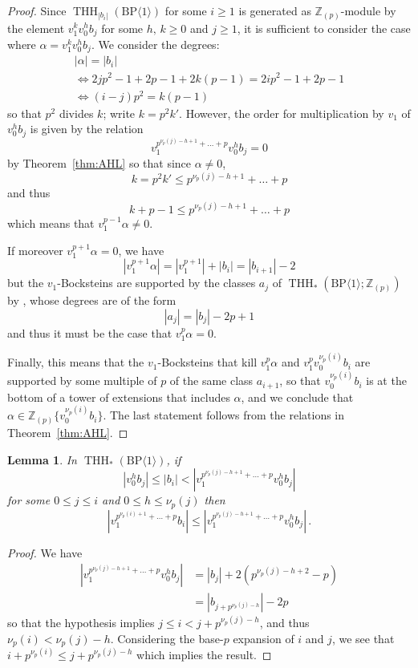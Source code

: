 \documentclass[11pt]{amsart}
\newcommand{\mr}[1]{\mathrm{#1}}
\newcommand{\Z}{\mathbb{Z}}
\newcommand{\BP}{\mr{BP}}
\DeclareMathOperator{\THH}{THH}
\newtheorem{lemma}[equation]{Lemma}
\theoremstyle{definition}
\numberwithin{equation}{section}
\numberwithin{figure}{section}
\begin{document}
\begin{proof}
  Since $\THH_{|b_i|}(\BP\langle 1\rangle)$ for some $i\ge 1$ is generated as $\Z_{(p)}$-module by the element $v_1^k v_0^h b_j$ for some $h,\, k \geq 0$ and $j \geq 1$, it is sufficient to consider the case where $\alpha = v_1^k v_0^h b_j$. We consider the degrees:
  \[
    \begin{gathered}
      |\alpha| = |b_i| \\
      \iff 2j p^2 - 1 + 2p - 1 + 2k(p-1) = 2i p^2 - 1 + 2p - 1 \\
      \iff (i - j)p^2 = k(p -1)
    \end{gathered}
  \]
  so that $p^2$ divides $k$; write $k = p^2 k'$. However, the order for multiplication by $v_1$ of $v_0^h b_j$ is given by the relation
  \[
    v_1^{p^{\nu_p(j) - h + 1}+ \dots + p} v_0^h b_j = 0
  \]
  by Theorem~\ref{thm:AHL} so that since $\alpha \neq 0$,
  \[
    k = p^2 k' \leq p^{\nu_p(j) - h + 1}+ \dots + p
  \]
  and thus
  \[
    k + p - 1 \leq p^{\nu_p(j) - h + 1}+ \dots + p
  \]
  which means that $v_1^{p - 1} \alpha \neq 0$.

  If moreover $v_1^{p+1} \alpha = 0$, we have 
  \[
    |v_1^{p+1} \alpha| = |v_1^{p+1}| + |b_i| = |b_{i+1}| - 2
  \]
  but the $v_1$-Bocksteins are supported by the classes $a_j$ of $\THH_*(\BP\langle 1\rangle; \Z_{(p)})$ by \cite[Theorem~6.4]{AHL10}, whose degrees are of the form
  \[
    |a_j| = |b_j| - 2p + 1
  \]
  and thus it must be the case that $v_1^p \alpha = 0$.
  
  Finally, this means that the $v_1$-Bocksteins that kill $v_1^p \alpha$ and $v_1^p v_0^{\nu_p(i)} b_i$ are supported by some multiple of $p$ of the same class $a_{i + 1}$, so that $v_0^{\nu_p(i)} b_i$ is at the bottom of a tower of extensions that includes $\alpha$, and we conclude that  $\alpha \in \Z_{(p)}\{ v_0^{\nu_p(i)} b_i \}$. The last statement follows from the relations in Theorem~\ref{thm:AHL}. 
\end{proof}

\begin{lemma} \label{lem:thhell2}
  In $\THH_*(\BP\langle 1\rangle)$, if
  \[
    |v_0^hb_j| \leq | b_i| < | v_1^{p^{\nu_p(j) - h + 1} + \dots + p} v_0^hb_j |
  \]
  for some $ 0 \leq j \leq i$ and $0 \leq h \leq \nu_p(j)$ then
  \[
    | v_1^{p^{\nu_p(i) + 1} + \dots + p} b_i | \leq | v_1^{p^{\nu_p(j) - h + 1} + \dots + p} v_0^hb_j | \,.
  \]
\end{lemma}

\begin{proof}
  We have
  \[
    \begin{aligned}
      | v_1^{p^{\nu_p(j) - h + 1} + \dots + p} v_0^hb_j |
      & = |b_j| + 2(p^{\nu_p(j) - h + 2} - p) \\
      & = |b_{j + p^{\nu_p(j) - h}} | - 2p
    \end{aligned}
  \]
  so that the hypothesis implies $j \leq i < j + p^{\nu_p(j) - h}$, and thus $\nu_p(i) < \nu_p(j) - h$. Considering the base-$p$ expansion of $i$ and $j$, we see that $ i + p^{\nu_p(i)} \leq j + p^{\nu_p(j) - h}$ which implies the result.
\end{proof}
\end{document}
